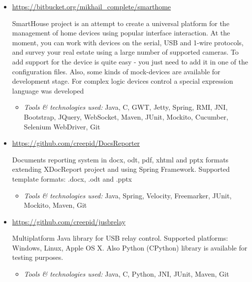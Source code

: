 \documentclass[a4paper, 12pt]{article}
\newcommand{\itemlabel}[1]{
    \textit{#1:}}
\begin{document}
  
    \begin{itemize}
   
        \item \href{https://bitbucket.org/mikhail_complete/smarthome/src}{https://bitbucket.org/mikhail\_complete/smarthome}

            SmartHouse project is an attempt to create a universal platform for the management of home devices using popular interface interaction. At the moment, you can work with devices on the serial, USB and 1-wire protocols, and survey your real estate using a large number of supported cameras. To add support for the device is quite easy - you just need to add it in one of the configuration files. Also, some kinds of mock-devices are available for development stage.
            For complex logic devices control a special expression language was developed
                        
            \begin{itemize}
                \item \itemlabel{Tools \& technologies used} Java, C, GWT, Jetty, Spring, RMI, JNI, Bootstrap, JQuery, WebSocket, Maven, JUnit, Mockito, Cucumber, Selenium WebDriver, Git
            \end{itemize}
            

        \item \href{https://github.com/creepid/DocsReporter}{https://github.com/creepid/DocsReporter}

            Documents reporting system in docx, odt, pdf, xhtml and pptx formats extending XDocReport project and using Spring Framework.
Supported template formats: .docx, .odt and .pptx

            \begin{itemize}
                \item \itemlabel{Tools \& technologies used} Java, Spring, Velocity, Freemarker, JUnit, Mockito, Maven, Git
            \end{itemize}
            
              \item \href{https://github.com/creepid/jusbrelay}{https://github.com/creepid/jusbrelay}

            Multiplatform Java library for USB relay control. Supported platforms: Windows, Linux, Apple OS X. Also Python (CPython) library is available for testing purposes.

            \begin{itemize}
                \item \itemlabel{Tools \& technologies used} Java, C, Python, JNI, JUnit, Maven, Git
            \end{itemize}
            

\end{itemize}
\end{document}
